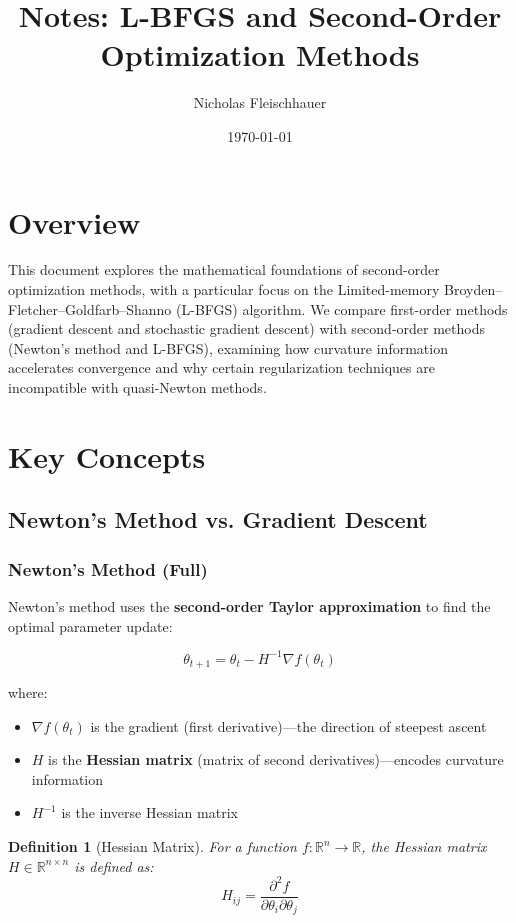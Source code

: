 \documentclass[11pt, a4paper, oneside]{article}
\title{Notes: L-BFGS and Second-Order Optimization Methods}
\author{Nicholas Fleischhauer}
\date{\today}
\newcommand{\R}{\mathbb{R}}
\newtheorem{definition}[theorem]{Definition}
\begin{document}
\maketitle

\section{Overview}

This document explores the mathematical foundations of second-order optimization methods, with a particular focus on the Limited-memory Broyden--Fletcher--Goldfarb--Shanno (L-BFGS) algorithm. We compare first-order methods (gradient descent and stochastic gradient descent) with second-order methods (Newton's method and L-BFGS), examining how curvature information accelerates convergence and why certain regularization techniques are incompatible with quasi-Newton methods.

\section{Key Concepts}

\subsection{Newton's Method vs. Gradient Descent}

\subsubsection{Newton's Method (Full)}

Newton's method uses the \textbf{second-order Taylor approximation} to find the optimal parameter update:

\begin{equation}
\theta_{t+1} = \theta_t - H^{-1} \nabla f(\theta_t)
\end{equation}

where:
\begin{itemize}
    \item $\nabla f(\theta_t)$ is the gradient (first derivative)---the direction of steepest ascent
    \item $H$ is the \textbf{Hessian matrix} (matrix of second derivatives)---encodes curvature information
    \item $H^{-1}$ is the inverse Hessian matrix
\end{itemize}

\begin{definition}[Hessian Matrix]
For a function $f: \R^n \to \R$, the Hessian matrix $H \in \R^{n \times n}$ is defined as:
\[
H_{ij} = \frac{\partial^2 f}{\partial \theta_i \partial \theta_j}
\]
\end{definition}
\end{document}
